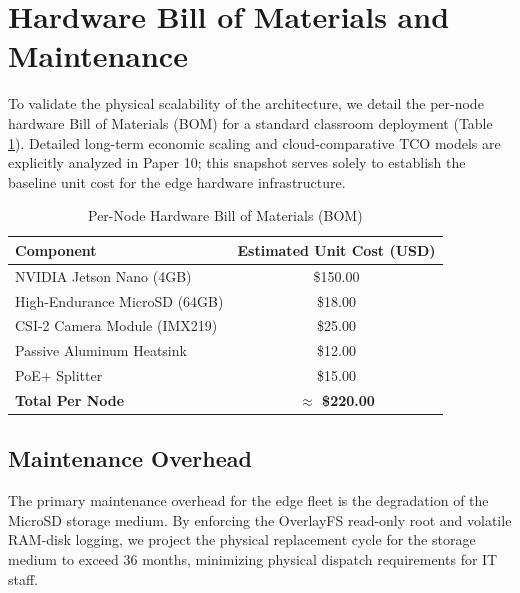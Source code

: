 \documentclass[conference]{IEEEtran}
\begin{document}
\section{Hardware Bill of Materials and Maintenance}

To validate the physical scalability of the architecture, we detail the per-node hardware Bill of Materials (BOM) for a standard classroom deployment (Table \ref{tab:bom}). Detailed long-term economic scaling and cloud-comparative TCO models are explicitly analyzed in Paper 10; this snapshot serves solely to establish the baseline unit cost for the edge hardware infrastructure.

\begin{table}[htbp]
\caption{Per-Node Hardware Bill of Materials (BOM)}
\begin{center}
\begin{tabular}{lc}
\toprule
\textbf{Component} & \textbf{Estimated Unit Cost (USD)} \\
\midrule
NVIDIA Jetson Nano (4GB) & \$150.00 \\
High-Endurance MicroSD (64GB) & \$18.00 \\
CSI-2 Camera Module (IMX219) & \$25.00 \\
Passive Aluminum Heatsink & \$12.00 \\
PoE+ Splitter & \$15.00 \\
\midrule
\textbf{Total Per Node} & \textbf{$\approx$ \$220.00} \\
\bottomrule
\end{tabular}
\end{center}
\label{tab:bom}
\end{table}

\subsection{Maintenance Overhead}
The primary maintenance overhead for the edge fleet is the degradation of the MicroSD storage medium. By enforcing the OverlayFS read-only root and volatile RAM-disk logging, we project the physical replacement cycle for the storage medium to exceed 36 months, minimizing physical dispatch requirements for IT staff.

\end{document}
